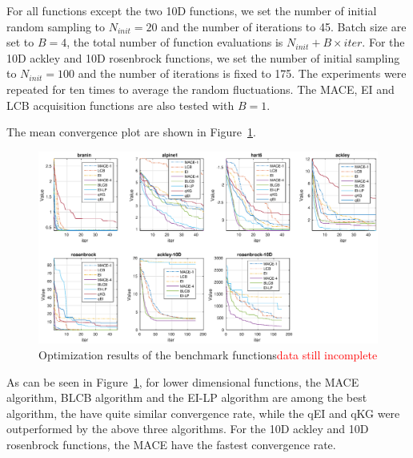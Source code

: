 For all functions except the two 10D functions, we set the number of initial
random sampling to $N_{init} = 20$ and the number of iterations to 45. Batch
size are set to $B = 4$, the total number of function evaluations is $N_{init}
+ B \times iter$. For the 10D ackley and 10D rosenbrock functions, we set the
number of initial sampling to $N_{init} = 100$ and the number of iterations is
fixed to 175. The experiments were repeated for ten times to average the random
fluctuations. The MACE, EI and LCB acquisition functions are also tested with
$B = 1$.

The mean convergence plot are shown in Figure~\ref{fig:CovPlotBenchmark}.

\begin{figure}[htbp]
    \vskip 0.2in
    \begin{center}
        \centerline{\includegraphics[width=\linewidth]{./img/convplot.eps}}
        \caption{Optimization results of the benchmark functions\textcolor{red}{data still incomplete}}
        \label{fig:CovPlotBenchmark}
    \end{center}
    \vskip -0.2in
\end{figure}

As can be seen in Figure~\ref{fig:CovPlotBenchmark}, for lower dimensional
functions, the MACE algorithm, BLCB algorithm and the EI-LP algorithm are among
the best algorithm, the have quite similar convergence rate, while the qEI and
qKG were outperformed by the above three algorithms. For the 10D ackley and 10D
rosenbrock functions, the MACE have the fastest convergence rate.

